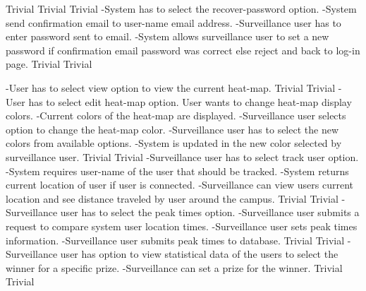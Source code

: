  		{Trivial}
    {Trivial}
    {Trivial}
 		{-System has to select the recover-password option.
 		-System send confirmation email to user-name email address.
		-Surveillance user has to enter password sent to email.
	  	-System allows surveillance user to set a new password if confirmation email password was correct 			 else reject and back to log-in page.}
    {Trivial}
    {Trivial}

		{-User has to select view option to view the current heat-map.}
		 {Trivial}
		 {Trivial}
		{-User has to select edit heat-map option.
		 {User wants to change heat-map display colors.}
		{-Current colors of the heat-map are displayed.
		-Surveillance user selects option to change the heat-map color.
		-Surveillance user has to select the new colors from available options.
		-System is updated in the new color selected by surveillance user.}	
		}
    {Trivial}
    {Trivial}	
		{-Surveillance user has to select track user option.
		-System requires user-name of the user that should be tracked.
		-System returns current location of user if user is connected.
		-Surveillance can view users current location and see distance traveled by user around the campus.}
    {Trivial}
    {Trivial}
		{-Surveillance user has to select the peak times option.
		-Surveillance user submits a request to compare system user location times.
		-Surveillance user sets peak times information.
		-Surveillance user submits peak times to database.}
    {Trivial}
    {Trivial}
		{-Surveillance user has option to view statistical data of the users to select the winner for a specific prize.
		 -Surveillance can set a prize for the winner.}
    {Trivial}
    {Trivial}
